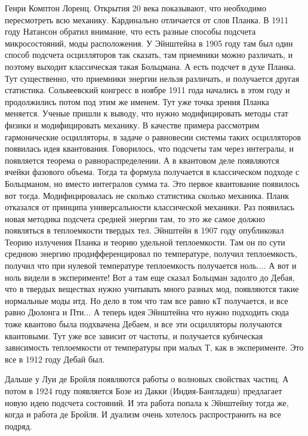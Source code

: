 \documentclass[a4paper, 12pt]{article}
\begin{document}
Генри Комптон Лоренц. Открытия 20 века показывают, что необходимо 
пересмотреть всю механику. Кардинально отличается от слов Планка. В 1911 
году Натансон обратил внимание, что есть разные способы подсчета 
микросостояний, моды расположения. У Эйнштейна в 1905 году там был один 
способ подсчета осцилляторов так сказать, там приемники можно различать, 
и поэтому выходит классическая такая Больцмана. А есть подсчет в духе 
Планка. Тут существенно, что приемники энергии нельзя различать, 
и получается другая статистика. Сольвеевский конгресс в ноябре 1911 года 
начались в этом году и продолжились потом под этим же именем. Тут уже 
точка зрения Планка меняется. Ученые пришли к выводу, что нужно 
модифицировать методы стат физики и модифицировать механику. В качестве 
примера рассмотрим гармонические осцилляторы, в задаче о равновесии 
системы таких осцилляторов появилась идея квантования. Говорилось, что 
подсчеты там через интегралы, и появляется теорема о равнораспределении. 
А в квантовом деле появляются ячейки фазового объема. Тогда та формула 
получается в классическом подходе с Больцманом, но вместо интегралов 
сумма та. Это первое квантование появилось вот тогда. Модифицировалась 
не сколько статистика сколько механика. Планк отказался от принципа 
универсальности классической механики. Раз появилась новая методика 
подсчета средней энергии там, то это же самое должно появляться 
в теплоемкости твердых тел. Эйнштейн в 1907 году опубликовал Теорию 
излучения Планка и теорию удельной теплоемкости. Там он по сути среднюю 
энергию продифференцировал по температуре, получил теплоемкость, получил 
что при нулевой температуре теплоемкость получается ноль.... А вот 
и ноль видели в эксперименте! Вот а там еще сказал Больцман задолго до 
Дебая, что в твердых веществах нужно учитывать много разных мод, 
появляются такие нормальные моды итд. Но дело в том что там все равно кТ 
получается, и все равно Дюлонга и Пти... А теперь идея Эйнштейна что 
нужно подходить сюда тоже квантово была подхвачена Дебаем, и все эти 
осцилляторы получаются квантовыми. Тут уже все зависит от частоты, 
и получается кубическая зависимость теплоемкости от температуры при 
малых Т, как в эксперименте. Это все в 1912 году Дебай был.

Дальше у Луи де Бройля появляются работы о волновых свойствах частиц. 
А потом в 1924 году появляется Бозе из Дакки (Индия-Бангладеш) 
предлагает новую идею подсчета состояний. И эта работа попала 
к Эйнштейну тогда же, когда и работа де Бройля. И дуализм очень хотелось 
распространить на все подряд.
\end{document}
